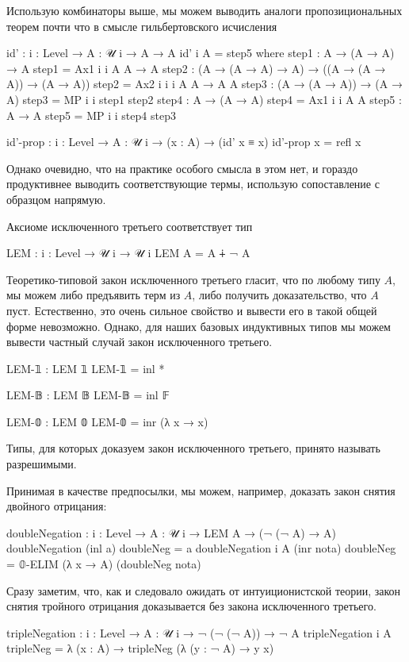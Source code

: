 \documentclass{article}[12pt]
\begin{document}
Использую комбинаторы выше, мы можем выводить аналоги пропозициональных теорем почти что
в смысле гильбертовского исчисления
\begin{code}
id' : {i : Level} → {A : 𝒰 i} → A → A
id' {i} {A} = step5
    where
        step1 : A → (A → A) → A
        step1 = Ax1 {i} {i} {A} {A → A}
        step2 : (A → (A → A) → A) → ((A → (A → A)) → (A → A))
        step2 = Ax2 {i} {i} {i} {A} {A → A} {A}
        step3 : (A → (A → A)) → (A → A)
        step3 = MP {i} {i} step1 step2
        step4 : A → (A → A)
        step4 = Ax1 {i} {i} {A} {A}
        step5 : A → A
        step5 = MP {i} {i} step4 step3

id'-prop : {i : Level} → {A : 𝒰 i}
           → (x : A) → (id' x ≡ x)
id'-prop x = refl x
\end{code}
Однако очевидно, что на практике особого смысла в этом нет, и гораздо продуктивнее
выводить соответствующие термы, использую сопоставление с образцом напрямую.

Аксиоме исключенного третьего соответствует тип
\begin{code}
LEM : {i : Level} → 𝒰 i → 𝒰 i
LEM A = A ∔ ¬ A
\end{code}
Теоретико-типовой закон исключенного третьего гласит, что по любому типу $A$, мы можем
либо предъявить терм из $A$, либо получить доказательство, что $A$ пуст. Естественно,
это очень сильное свойство и вывести его в такой общей форме невозможно. Однако, для наших
базовых индуктивных типов мы можем вывести частный случай закон исключенного третьего.
\begin{code}
LEM-𝟙 : LEM 𝟙
LEM-𝟙 = inl *

LEM-𝔹 : LEM 𝔹
LEM-𝔹 = inl 𝔽

LEM-𝟘 : LEM 𝟘
LEM-𝟘 = inr (λ x → x)
\end{code}
Типы, для которых доказуем закон исключенного третьего, принято называть разрешимыми.

Принимая  в качестве предпосылки, мы можем, например, доказать
закон снятия двойного отрицания:
\begin{code}
doubleNegation : {i : Level} → {A : 𝒰 i} → LEM A → (¬ (¬ A) → A)
doubleNegation (inl a) doubleNeg = a
doubleNegation {i} {A} (inr nota) doubleNeg = 𝟘-ELIM (λ x → A) (doubleNeg nota)
\end{code}
Сразу заметим, что, как и следовало ожидать от интуиционистской теории, закон
снятия тройного отрицания доказывается без закона исключенного третьего.
\begin{code}
tripleNegation : {i : Level} → {A : 𝒰 i} → ¬ (¬ (¬ A)) → ¬ A
tripleNegation {i} {A} tripleNeg = λ (x : A)  → tripleNeg (λ (y : ¬ A) → y x)
\end{code}
\end{document}
